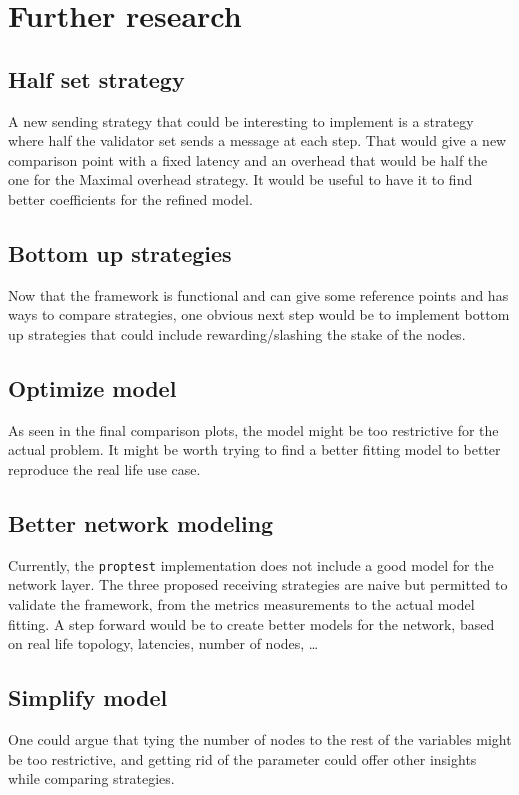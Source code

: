 
\section{Further research}
\subsection{Half set strategy}
A new sending strategy that could be interesting to implement is a strategy
where half the validator set sends a message at each step. That would give a new
comparison point with a fixed latency and an overhead that would be half the one
for the Maximal overhead strategy. It would be useful to have it to find better
coefficients for the refined model.

\subsection{Bottom up strategies}
Now that the framework is functional and can give some reference points and has
ways to compare strategies, one obvious next step would be to implement bottom
up strategies that could include rewarding/slashing the stake of the nodes.

\subsection{Optimize model}
As seen in the final comparison plots, the model might be too restrictive for
the actual problem. It might be worth trying to find a better fitting model to
better reproduce the real life use case.

\subsection{Better network modeling}
Currently, the \texttt{proptest} implementation does not include a good model
for the network layer. The three proposed receiving strategies are naive but
permitted to validate the framework, from the metrics measurements to the actual
model fitting. A step forward would be to create better models for the
network, based on real life topology, latencies, number of nodes, \ldots

\subsection{Simplify model}
One could argue that tying the number of nodes to the rest of the variables
might be too restrictive, and getting rid of the parameter could offer other
insights while comparing strategies.
